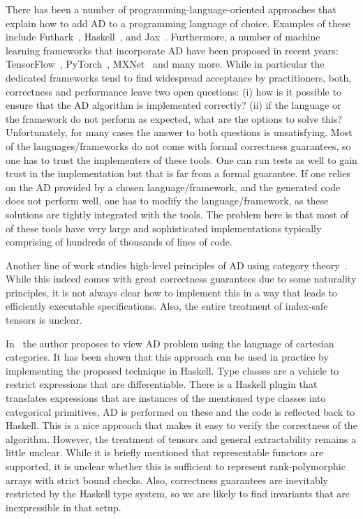 There has been a number of programming-language-oriented approaches that explain
how to add AD to a programming language of choice. Examples of these include
Futhark~\cite{futhark/sc22ad}, Haskell~\cite{ad-haskell}, and
Jax~\cite{ad-jax,radul2023you}. Furthermore, a number of machine learning
frameworks that incorporate AD have been proposed in recent years: TensorFlow~\cite{ad-tf},
PyTorch~\cite{ad-pytorch}, MXNet~\cite{ad-mxnet} and many more.
While in particular the dedicated frameworks tend to find widespread 
acceptance by practitioners, both, correctness and performance leave
two open questions: (i) how is it possible to
ensure that the AD algorithm is implemented correctly?
(ii) if the
language or the framework do not perform as expected, what are the
options to solve this?  Unfortunately, for many cases the answer to
both questions is unsatisfying.  Most of the languages/frameworks do not
come with formal correctness guarantees, so one has to trust the
implementers of these tools.  One can run tests as well to gain trust 
in the implementation but that is far from a 
formal guarantee.  If one relies
on the AD provided by a chosen language/framework, and the generated code does not
perform well, one has to modify the language/framework, as these solutions
are tightly integrated with the tools. The problem here is that most of of these tools
have very large and sophisticated implementations typically comprising
of hundreds of thousands of lines of code.

Another line of work studies high-level principles of AD using
category theory~\cite{ad-theor1, ad-theor2, ad-theor3}.
While this indeed comes with great correctness guarantees due to
some naturality principles, it is not always clear how to implement
this in a way that leads to efficiently executable specifications.  Also, the
entire treatment of index-safe tensors is unclear.

In~\cite{ad-elliott} the author proposes to view AD problem using
the language of cartesian categories.  It has been shown that
this approach can be used in practice by implementing the proposed
technique in Haskell.  Type classes are a vehicle to restrict expressions
that are differentiable.  There is a Haskell plugin that translates
expressions that are instances of the mentioned type classes into
categorical primitives, AD is performed on these and the code is reflected
back to Haskell.  This is a nice approach that makes it easy
to verify the correctness of the algorithm.  However, the treatment
of tensors and general extractability remains a little unclear.
While it is briefly mentioned that representable functors
are supported, it is unclear whether this is sufficient to
represent rank-polymorphic arrays with strict bound checks.
Also, correctness guarantees are inevitably restricted by the
Haskell type system, so we are likely to find invariants that
are inexpressible in that setup.

